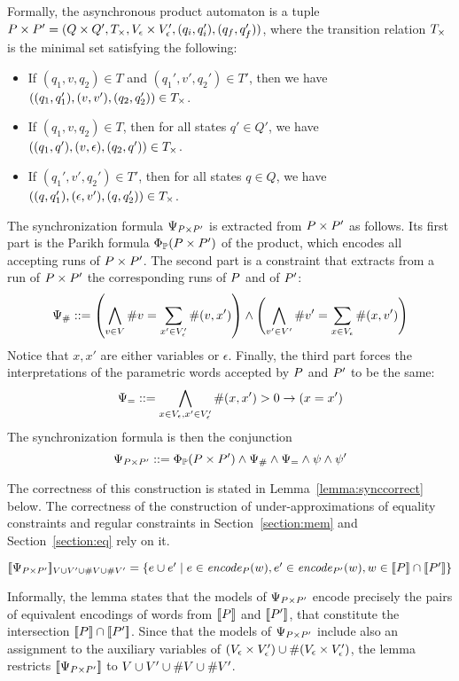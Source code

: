 \documentclass[sigplan,review,anonymous]{acmart}\settopmatter{printfolios=true,printccs=false,printacmref=false}
\begin{document}
Formally, the asynchronous product automaton is a tuple $P \times P' = (Q\times Q', T_\times, V_\epsilon \times V'_\epsilon, (q_i,q_i'),(q_f,q_f'))$, where the transition relation $T_\times$ is the minimal set satisfying the following:
%
\begin{itemize}
\item If $(q_1,v,q_2) \in T$ and $(q_1',v',q_2') \in T'$, then we have $((q_1,q_1'),(v,v'),(q_2,q_2'))\in T_\times$.
\item If $(q_1,v,q_2) \in T$, then for all states $q'\in Q'$, we have $((q_1,q'),(v,\epsilon),(q_2,q'))\in T_\times$.
\item If $(q_1',v',q_2') \in T'$, then for all states $q\in Q$, we have $((q,q_1'),(\epsilon,v'),(q,q_2'))\in T_\times$.
\end{itemize}	
%
The synchronization formula $\Psi_{P \times P'}$ is extracted from $P \times P'$ as follows.
Its first part is the Parikh formula $\Phi_{\mathbb{P}}(P \times P')$ of the product, which encodes all accepting runs of $P \times P'$.
%
The second part is a constraint that extracts from a run of $P \times P'$ the corresponding runs of $P$ and of $P'$:
$$ \Psi_{\#} ::= 
\left(\bigwedge_{v\in V}\#v = \sum_{x' \in V'_\epsilon} \#{(v,x')}\right)
\land
\left(\bigwedge_{v'\in V'} \#v' = \sum_{x \in V_\epsilon} \#{(x,v')}\right)
$$
Notice that $x,x'$ are either variables or $\epsilon$.
Finally, the third part forces the interpretations of the parametric words accepted by $P$ and $P'$ to be the same:
$$ \Psi_= ::=
\bigwedge_{x\in V_\epsilon,x'\in V'_\epsilon} \#(x,x')>0 \rightarrow (x=x')
$$
The synchronization formula is then the conjunction 
$$
\Psi_{P \times P'} ::= \Phi_{\mathbb{P}}(P \times P') \land \Psi_{\#} \land \Psi_= \land \psi \land \psi'
$$

The correctness of this construction is stated in Lemma~\ref{lemma:synccorrect} below. 
The correctness of the construction of under-approximations of equality constraints and regular constraints in Section~\ref{section:mem} and Section~\ref{section:eq} rely on it. 
%

\begin{lemma}\label{lemma:synccorrect}
$
[\![\Psi_{P \times P'}]\!]_{V\cup V' \cup \#{V}\cup\#{V'}} =
\{e\cup e'\mid e \in \mathit{encode}_{P} (w), e'\in\mathit{encode}_{P'} (w), w\in[\![P]\!] \cap [\![P']\!]\} 
$
\end{lemma}

Informally, the lemma states that the models of $\Psi_{P \times P'}$ encode precisely the pairs of equivalent encodings of words from $[\![P]\!]$ and $[\![P']\!]$, that constitute the intersection $[\![P]\!] \cap [\![P']\!]$. 
Since that the models of $\Psi_{P \times P'}$ include also an assignment to the auxiliary variables of $(V_\epsilon\times V'_\epsilon) \cup \#{(V_\epsilon\times V'_\epsilon)}$, the lemma restricts $[\![\Psi_{P \times P'}]\!]$ to ${V\cup V' \cup \#{V}\cup\#{V'}}$. 
\end{document}
